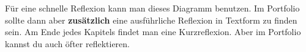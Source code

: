 \documentclass{scrartcl}  %
\begin{document}
						\noindent Für eine schnelle Reflexion kann man dieses Diagramm benutzen. Im Portfolio sollte dann aber \textbf{zusätzlich} eine ausführliche Reflexion in Textform zu finden sein. Am Ende jedes Kapitels findet man eine Kurzreflexion. Aber im Portfolio kannst du auch öfter reflektieren. 
						
						
\end{document}

